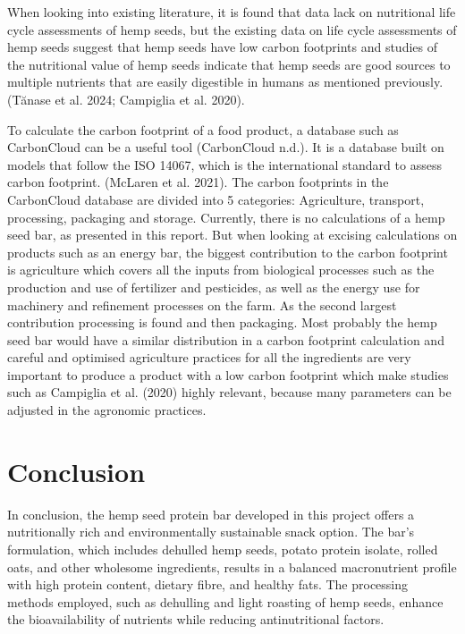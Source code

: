 \vspace{1em}
When looking into existing literature, it is found that data lack on nutritional life cycle assessments of hemp seeds, but the existing data on life cycle assessments of hemp seeds suggest that hemp seeds have low carbon footprints and studies of the nutritional value of hemp seeds indicate that hemp seeds are good sources to multiple nutrients that are easily digestible in humans as mentioned previously. (Tănase et al. 2024; Campiglia et al. 2020). 

\vspace{1em}
To calculate the carbon footprint of a food product, a database such as CarbonCloud can be a useful tool (CarbonCloud n.d.). It is a database built on models that follow the ISO 14067, which is the international standard to assess carbon footprint. (McLaren et al. 2021). The carbon footprints in the CarbonCloud database are divided into 5 categories: Agriculture, transport, processing, packaging and storage. Currently, there is no calculations of a hemp seed bar, as presented in this report. But when looking at excising calculations on products such as an energy bar, the biggest contribution to the carbon footprint is agriculture which covers all the inputs from biological processes such as the production and use of fertilizer and pesticides, as well as the energy use for machinery and refinement processes on the farm. As the second largest contribution processing is found and then packaging. Most probably the hemp seed bar would have a similar distribution in a carbon footprint calculation and careful and optimised agriculture practices for all the ingredients are very important to produce a product with a low carbon footprint which make studies such as Campiglia et al. (2020) highly relevant, because many parameters can be adjusted in the agronomic practices.
 
\section{Conclusion}
In conclusion, the hemp seed protein bar developed in this project offers a nutritionally rich and environmentally sustainable snack option. The bar's formulation, which includes dehulled hemp seeds, potato protein isolate, rolled oats, and other wholesome ingredients, results in a balanced macronutrient profile with high protein content, dietary fibre, and healthy fats. The processing methods employed, such as dehulling and light roasting of hemp seeds, enhance the bioavailability of nutrients while reducing antinutritional factors.

